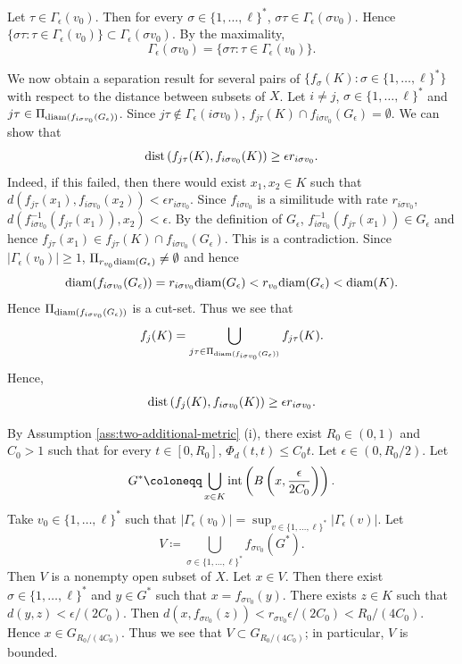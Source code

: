 \documentclass[a4paper, reqno, 11pt]{amsart}
\theoremstyle{definition}
\begin{document}
Let $\tau \in \Gamma_{\epsilon}(v_0)$. 
Then for every $\sigma \in \{1,\dots, \ell\}^{*}$, $\sigma \tau \in \Gamma_{\epsilon}(\sigma v_0)$. 
Hence $ \{\sigma \tau \colon \tau \in \Gamma_{\epsilon}(v_0)\} \subset \Gamma_{\epsilon}(\sigma v_0)$. 
By the maximality, 
\[ \Gamma_{\epsilon}(\sigma v_0) = \{\sigma \tau \colon \tau \in \Gamma_{\epsilon}(v_0)\}.\]  


We now obtain a separation result for several pairs of $\{f_{\sigma}(K) \colon \sigma \in \{1, \dots, \ell\}^{*} \}$ with respect to the distance between subsets of $X$. 
Let $i \ne j$, $\sigma \in \{1, \dots, \ell\}^{*}$ and $j \tau \in \Pi_{\textup{diam}(f_{i \sigma v_0}(G_{\epsilon}))}$. 
Since $j \tau \notin \Gamma_{\epsilon}(i\sigma v_0)$, $f_{j \tau}(K) \cap f_{i \sigma v_0}(G_{\epsilon}) = \emptyset$. 
We can show that  
\[ \textup{dist}\left(f_{j \tau}(K), f_{i \sigma v_0}(K) \right) \ge \epsilon r_{i \sigma v_0}.\]  
Indeed, if this failed, then there would exist $x_1, x_2 \in K$ such that $d(f_{j \tau}(x_1), f_{i \sigma v_0}(x_2)) < \epsilon r_{i \sigma v_0}$. 
Since $ f_{i \sigma v_0}$ is a similitude with rate $r_{i \sigma v_0}$, 
$d\left(f_{i \sigma v_0}^{-1}(f_{j \tau}(x_1)), x_2 \right) < \epsilon$. 
By the definition of $G_{\epsilon}$, $f_{i \sigma v_0}^{-1}(f_{j \tau}(x_1)) \in G_{\epsilon}$ and hence $f_{j \tau}(x_1) \in f_{j \tau}(K) \cap f_{i \sigma v_0}(G_{\epsilon})$. 
This is a contradiction. 
Since $\left|\Gamma_{\epsilon}(v_0) \right| \ge 1$, $\Pi_{r_{v_0} \textup{diam}(G_{\epsilon})} \ne \emptyset$ and hence 
\[ \textup{diam}(f_{i \sigma v_0}(G_{\epsilon})) = r_{i \sigma v_0} \textup{diam}(G_{\epsilon}) < r_{v_0} \textup{diam}(G_{\epsilon}) < \textup{diam}(K).\]
Hence $\Pi_{\textup{diam}(f_{i \sigma v_{0}}(G_{\epsilon}))}$ is a cut-set. 
Thus we see that 
\[ f_j (K) = \bigcup_{j\tau \in \Pi_{\textup{diam}(f_{i \sigma v_{0}}(G_{\epsilon}))}} f_{j\tau}(K). \] 
Hence, 
\begin{equation}\label{eq:separation-set-dist}  
\textup{dist}\left(f_{j}(K), f_{i \sigma v_{0}}(K) \right) \ge \epsilon r_{i \sigma v_{0}}. 
\end{equation}

By Assumption \ref{ass:two-additional-metric} (i), 
there exist $R_0 \in (0,1)$ and $C_0 > 1$ such that for every $t \in [0, R_0]$, $\Phi_d (t,t) \le C_0 t$. 
Let $\epsilon \in (0, R_0 /2)$. 
Let 
\[ G^* \coloneqq \bigcup_{x \in K} \textup{int} \left(B\left(x, \frac{\epsilon}{2C_0} \right)\right).\] 
Take $v_0 \in \{1, \dots, \ell\}^{*}$ such that  $\left|\Gamma_{\epsilon}(v_0) \right| = \sup_{v \in \{1, \dots, \ell\}^{*}} \left|\Gamma_{\epsilon}(v) \right|$. 
Let 
\[ V \coloneqq \bigcup_{\sigma \in \{1, \dots, \ell\}^{*}} f_{\sigma v_0} \left(G^{*} \right). \]  
Then $V$ is a nonempty open subset of $X$. 
Let $x \in V$. 
Then there exist $\sigma \in \{1, \dots, \ell\}^{*}$ and $y \in G^*$ such that $x = f_{\sigma v_{0}} (y)$. 
There exists $z \in K$ such that $d(y,z) < \epsilon/(2C_0)$. 
Then $d(x, f_{\sigma v_{0}}(z)) < r_{\sigma v_{0}}  \epsilon/(2C_0) < R_0 / (4 C_0)$. 
Hence $x \in G_{R_0 / (4 C_0)}$. 
Thus we see that $V \subset G_{R_0 / (4 C_0)}$; in particular, $V$ is bounded. 
\end{document}
